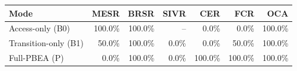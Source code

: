 \begin{tabular}{lrrrrrr}
\toprule
Mode & MESR & BRSR & SIVR & CER & FCR & OCA \\
\midrule
Access-only (B0) & 100.0\% & 100.0\% & -- & 0.0\% & 0.0\% & 100.0\% \\
Transition-only (B1) & 50.0\% & 100.0\% & 0.0\% & 0.0\% & 50.0\% & 100.0\% \\
Full-PBEA (P) & 0.0\% & 100.0\% & 0.0\% & 100.0\% & 100.0\% & 100.0\% \\
\bottomrule
\end{tabular}
